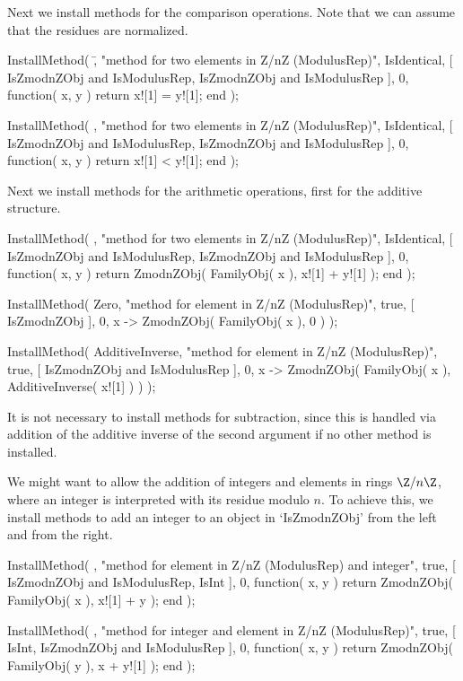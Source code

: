 Next we install methods for the comparison operations.
Note that we can assume that the residues are normalized.

\beginexample
    InstallMethod( \=,
        "method for two elements in Z/nZ (ModulusRep)",
        IsIdentical,
        [ IsZmodnZObj and IsModulusRep, IsZmodnZObj and IsModulusRep ],
        0,
        function( x, y ) return x![1] = y![1]; end );

    InstallMethod( \<,
        "method for two elements in Z/nZ (ModulusRep)",
        IsIdentical,
        [ IsZmodnZObj and IsModulusRep, IsZmodnZObj and IsModulusRep ],
        0,
        function( x, y ) return x![1] < y![1]; end );
\endexample

Next we install methods for the arithmetic operations,
first for the additive structure.

\beginexample
    InstallMethod( \+,
        "method for two elements in Z/nZ (ModulusRep)",
        IsIdentical,
        [ IsZmodnZObj and IsModulusRep, IsZmodnZObj and IsModulusRep ],
        0,
        function( x, y )
        return ZmodnZObj( FamilyObj( x ), x![1] + y![1] );
        end );

    InstallMethod( Zero,
        "method for element in Z/nZ (ModulusRep)",
        true,
        [ IsZmodnZObj ], 0,
        x -> ZmodnZObj( FamilyObj( x ), 0 ) );

    InstallMethod( AdditiveInverse,
        "method for element in Z/nZ (ModulusRep)",
        true,
        [ IsZmodnZObj and IsModulusRep ], 0,
        x -> ZmodnZObj( FamilyObj( x ), AdditiveInverse( x![1] ) ) );
\endexample

It is not necessary to install methods for subtraction,
since this is handled via addition of the additive inverse of
the second argument if no other method is installed.

We might want to allow the addition of integers and elements in
rings $\Z/n\Z$, where an integer is interpreted with its residue modulo
$n$.
To achieve this, we install methods to add an integer to an object in
`IsZmodnZObj' from the left and from the right.

\beginexample
    InstallMethod( \+,
        "method for element in Z/nZ (ModulusRep) and integer",
        true,
        [ IsZmodnZObj and IsModulusRep, IsInt ], 0,
        function( x, y )
        return ZmodnZObj( FamilyObj( x ), x![1] + y );
        end );

    InstallMethod( \+,
        "method for integer and element in Z/nZ (ModulusRep)",
        true,
        [ IsInt, IsZmodnZObj and IsModulusRep ], 0,
        function( x, y )
        return ZmodnZObj( FamilyObj( y ), x + y![1] );
        end );
\endexample

